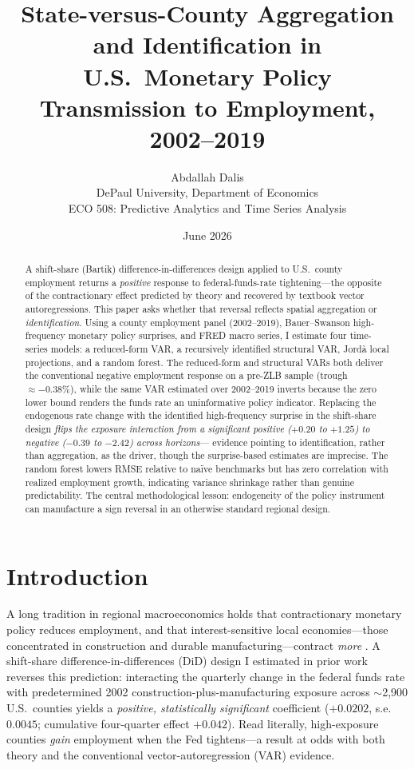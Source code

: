 \documentclass[11pt]{article}
\title{\textbf{State-versus-County Aggregation and Identification in U.S.\ Monetary
Policy Transmission to Employment, 2002--2019}}
\author{Abdallah Dalis\\ \small DePaul University, Department of Economics\\ \small ECO 508: Predictive Analytics and Time Series Analysis}
\date{June 2026}
\begin{document}
\maketitle

\begin{abstract}
\noindent A shift-share (Bartik) difference-in-differences design applied to U.S.\ county
employment returns a \emph{positive} response to federal-funds-rate tightening---the opposite
of the contractionary effect predicted by theory and recovered by textbook vector
autoregressions. This paper asks whether that reversal reflects spatial aggregation or
\emph{identification}. Using a county employment panel (2002--2019), Bauer--Swanson
high-frequency monetary policy surprises, and FRED macro series, I estimate four time-series
models: a reduced-form VAR, a recursively identified structural VAR, Jord\`a local projections,
and a random forest. The reduced-form and structural VARs both deliver the conventional
negative employment response on a pre-ZLB sample (trough $\approx -0.38\%$), while the same
VAR estimated over 2002--2019 inverts because the zero lower bound renders the funds rate an
uninformative policy indicator. Replacing the endogenous rate change with the identified
high-frequency surprise in the shift-share design \emph{flips the exposure interaction from a
significant positive ($+0.20$ to $+1.25$) to negative ($-0.39$ to $-2.42$) across horizons}---
evidence pointing to identification, rather than aggregation, as the driver, though the
surprise-based estimates are imprecise. The random forest lowers RMSE relative to na\"ive benchmarks but has
zero correlation with realized employment growth, indicating variance shrinkage rather than
genuine predictability. The central methodological lesson: endogeneity of the policy instrument
can manufacture a sign reversal in an otherwise standard regional design.
\end{abstract}

\clearpage

\section{Introduction}

A long tradition in regional macroeconomics holds that contractionary monetary policy reduces
employment, and that interest-sensitive local economies---those concentrated in construction
and durable manufacturing---contract \emph{more} \citep{carlino1998}. A shift-share
difference-in-differences (DiD) design I estimated in prior work reverses this prediction:
interacting the quarterly change in the federal funds rate with predetermined 2002
construction-plus-manufacturing exposure across $\sim$2{,}900 U.S.\ counties yields a
\emph{positive, statistically significant} coefficient ($+0.0202$, s.e.\ $0.0045$;
cumulative four-quarter effect $+0.042$). Read literally, high-exposure counties \emph{gain}
employment when the Fed tightens---a result at odds with both theory and the conventional
vector-autoregression (VAR) evidence.
\end{document}
